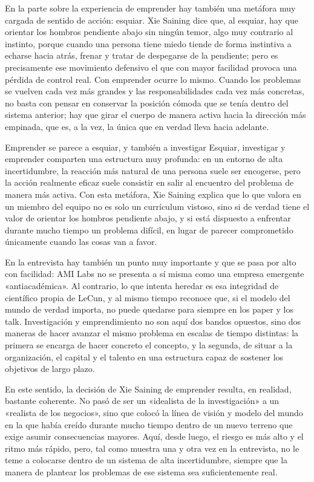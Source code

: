\documentclass[a4paper,12pt]{article}
\begin{document}
En la parte sobre la experiencia de emprender hay también una metáfora muy cargada de sentido de acción: esquiar. Xie Saining dice que, al esquiar, hay que orientar los hombros pendiente abajo sin ningún temor, algo muy contrario al instinto, porque cuando una persona tiene miedo tiende de forma instintiva a echarse hacia atrás, frenar y tratar de despegarse de la pendiente; pero es precisamente ese movimiento defensivo el que con mayor facilidad provoca una pérdida de control real. Con emprender ocurre lo mismo. Cuando los problemas se vuelven cada vez más grandes y las responsabilidades cada vez más concretas, no basta con pensar en conservar la posición cómoda que se tenía dentro del sistema anterior; hay que girar el cuerpo de manera activa hacia la dirección más empinada, que es, a la vez, la única que en verdad lleva hacia adelante.

\begin{importantbox}{Emprender se parece a esquiar, y también a investigar}
Esquiar, investigar y emprender comparten una estructura muy profunda: en un entorno de alta incertidumbre, la reacción más natural de una persona suele ser encogerse, pero la acción realmente eficaz suele consistir en salir al encuentro del problema de manera más activa. Con esta metáfora, Xie Saining explica que lo que valora en un miembro del equipo no es solo un currículum vistoso, sino si de verdad tiene el valor de orientar los hombros pendiente abajo, y si está dispuesto a enfrentar durante mucho tiempo un problema difícil, en lugar de parecer comprometido únicamente cuando las cosas van a favor.
\end{importantbox}

En la entrevista hay también un punto muy importante y que se pasa por alto con facilidad: AMI Labs no se presenta a sí misma como una empresa emergente «antiacadémica». Al contrario, lo que intenta heredar es esa integridad de científico propia de LeCun, y al mismo tiempo reconoce que, si el modelo del mundo de verdad importa, no puede quedarse para siempre en los paper y los talk. Investigación y emprendimiento no son aquí dos bandos opuestos, sino dos maneras de hacer avanzar el mismo problema en escalas de tiempo distintas: la primera se encarga de hacer concreto el concepto, y la segunda, de situar a la organización, el capital y el talento en una estructura capaz de sostener los objetivos de largo plazo.

En este sentido, la decisión de Xie Saining de emprender resulta, en realidad, bastante coherente. No pasó de ser un «idealista de la investigación» a un «realista de los negocios», sino que colocó la línea de visión y modelo del mundo en la que había creído durante mucho tiempo dentro de un nuevo terreno que exige asumir consecuencias mayores. Aquí, desde luego, el riesgo es más alto y el ritmo más rápido, pero, tal como muestra una y otra vez en la entrevista, no le teme a colocarse dentro de un sistema de alta incertidumbre, siempre que la manera de plantear los problemas de ese sistema sea suficientemente real.
\end{document}

